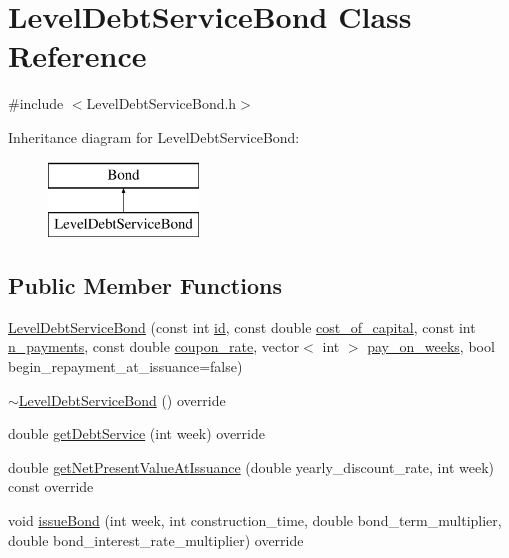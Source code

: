 \hypertarget{classLevelDebtServiceBond}{}\section{Level\+Debt\+Service\+Bond Class Reference}
\label{classLevelDebtServiceBond}


{\ttfamily \#include $<$Level\+Debt\+Service\+Bond.\+h$>$}

Inheritance diagram for Level\+Debt\+Service\+Bond\+:\begin{figure}[H]
\begin{center}
\leavevmode
\includegraphics[height=2.000000cm]{classLevelDebtServiceBond}
\end{center}
\end{figure}
\subsection*{Public Member Functions}
\begin{DoxyCompactItemize}
\item 
\mbox{\hyperlink{classLevelDebtServiceBond_a71af87d057090bd2310a10df03b36fdf_a71af87d057090bd2310a10df03b36fdf}{Level\+Debt\+Service\+Bond}} (const int \mbox{\hyperlink{classBond_a7f75bcafbc16676ad6dbafbf40afae4a_a7f75bcafbc16676ad6dbafbf40afae4a}{id}}, const double \mbox{\hyperlink{classBond_ad98df7d28b398e620286f95ee085439b_ad98df7d28b398e620286f95ee085439b}{cost\+\_\+of\+\_\+capital}}, const int \mbox{\hyperlink{classBond_a4a227b6de2eeada118d82ab1633b1db8_a4a227b6de2eeada118d82ab1633b1db8}{n\+\_\+payments}}, const double \mbox{\hyperlink{classBond_a5f66785534e24caa43d9f730130a6463_a5f66785534e24caa43d9f730130a6463}{coupon\+\_\+rate}}, vector$<$ int $>$ \mbox{\hyperlink{classBond_ae8dd46fcbf95c993460ffe4ea1f52739_ae8dd46fcbf95c993460ffe4ea1f52739}{pay\+\_\+on\+\_\+weeks}}, bool begin\+\_\+repayment\+\_\+at\+\_\+issuance=false)
\item 
\mbox{\hyperlink{classLevelDebtServiceBond_a6327829c1f1e6941cc22cea371cf024a_a6327829c1f1e6941cc22cea371cf024a}{$\sim$\+Level\+Debt\+Service\+Bond}} () override
\item 
double \mbox{\hyperlink{classLevelDebtServiceBond_adcb3bd3c34b0cbb7b013f387ddd8b7f5_adcb3bd3c34b0cbb7b013f387ddd8b7f5}{get\+Debt\+Service}} (int week) override
\item 
double \mbox{\hyperlink{classLevelDebtServiceBond_a0f5820c3e76b8b908dbe153a8291d96a_a0f5820c3e76b8b908dbe153a8291d96a}{get\+Net\+Present\+Value\+At\+Issuance}} (double yearly\+\_\+discount\+\_\+rate, int week) const override
\item 
void \mbox{\hyperlink{classLevelDebtServiceBond_a51a54a1a25be105b168bf86489aee417_a51a54a1a25be105b168bf86489aee417}{issue\+Bond}} (int week, int construction\+\_\+time, double bond\+\_\+term\+\_\+multiplier, double bond\+\_\+interest\+\_\+rate\+\_\+multiplier) override
\end{DoxyCompactItemize}
